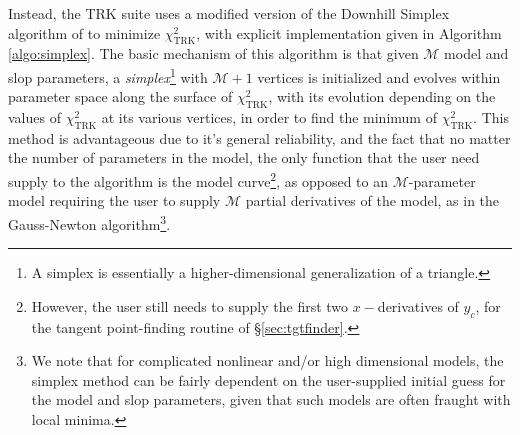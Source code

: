 Instead, the TRK suite uses a modified version of the Downhill Simplex algorithm of \textcite{NelderMead65} to minimize $\chi^2_\text{TRK}$, with explicit implementation given in Algorithm \ref{algo:simplex}. The basic mechanism of this algorithm is that given $\mathcal{M}$ model and slop parameters, a \textit{simplex}\footnote{A simplex is essentially a higher-dimensional generalization of a triangle.} with $\mathcal{M}+1$ vertices is initialized and evolves within parameter space along the surface of $\chi^2_\text{TRK}$, with its evolution depending on the values of $\chi^2_\text{TRK}$ at its various vertices, in order to find the minimum of $\chi^2_\text{TRK}$. This method is advantageous due to it's general reliability, and the fact that no matter the number of parameters in the model, the only function that the user need supply to the algorithm is the model curve\footnote{However, the user still needs to supply the first two $x-$derivatives of $y_c$, for the tangent point-finding routine of \S\ref{sec:tgtfinder}.}, as opposed to an $\mathcal{M}$-parameter model requiring the user to supply $\mathcal{M}$ partial derivatives of the model, as in the Gauss-Newton algorithm\footnote{We note that for complicated nonlinear and/or high dimensional models, the simplex method can be fairly dependent on the user-supplied initial guess for the model and slop parameters, given that such models are often fraught with local minima.}. 
